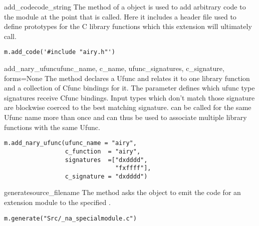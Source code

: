\begin{methoddesc}{add_code}{code_string}
The  method of a  object is used to add
arbitrary code to the module at the point that  is
called. Here it includes a header file used to define prototypes for the C
library functions which this extension will ultimately call.
\begin{verbatim}
m.add_code('#include "airy.h"')
\end{verbatim}
\end{methoddesc}

\begin{methoddesc}{add_nary_ufunc}{ufunc_name, c_name,
    ufunc_signatures, c_signature, forms=None} 
The  method declares a Ufunc and relates it to one
library function and a collection of Cfunc bindings for it.  The
 parameter defines which ufunc type signatures receive Cfunc
bindings. Input types which don't match those signature are blockwise coerced
to the best matching signature.   can be called for
the same Ufunc name more than once and can thus be used to associate multiple
library functions with the same Ufunc.
\begin{verbatim}
m.add_nary_ufunc(ufunc_name = "airy",
                 c_function  = "airy",    
                 signatures  =["dxdddd",
                               "fxffff"],
                 c_signature = "dxdddd")
\end{verbatim}
\end{methoddesc}

\begin{methoddesc}{generate}{source_filename}
The  method asks the  object to emit the
code for an extension module to the specified .
\begin{verbatim}
m.generate("Src/_na_specialmodule.c")
\end{verbatim}
\end{methoddesc}

